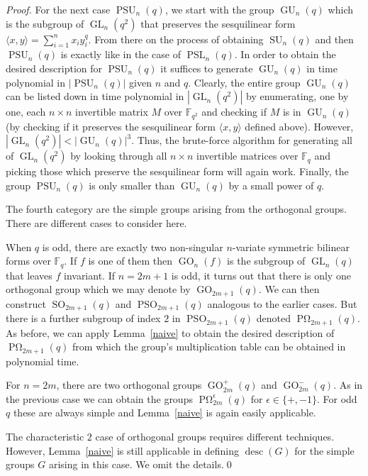 \documentclass{elsarticle}
\newcommand{\desc}{\mathop{\mathrm{desc}}}
\newcommand{\GL}{\mathop{\mathrm{GL}}\nolimits}
\newcommand{\PSL}{\mathop{\mathrm{PSL}}\nolimits}
\newcommand{\GU}{\mathop{\mathrm{GU}}\nolimits}
\newcommand{\PSU}{\mathop{\mathrm{PSU}}\nolimits}
\newcommand{\SU}{\mathop{\mathrm{SU}}\nolimits}
\newcommand{\POm}{\mathop{\mathrm{P}\Omega}\nolimits}
\newcommand{\GO}{\mathop{\mathrm{GO}}\nolimits}
\newcommand{\SO}{\mathop{\mathrm{SO}}\nolimits}
\newcommand{\PSO}{\mathop{\mathrm{PSO}}\nolimits}
\newcommand{\F}{\mathbb{F}}
\renewcommand{\angle}[1]{\langle#1\rangle} %
\begin{document}
\begin{proof}
  For the next case $\PSU_n(q)$, we start with the group $\GU_n(q)$
  which is the subgroup of $\GL_n(q^2)$ that preserves the
  sesquilinear form $\angle{x,y}=\sum_{i=1}^n x_i y_i^q$. From there
  on the process of obtaining $\SU_n(q)$ and then $\PSU_n(q)$ is
  exactly like in the case of $\PSL_n(q)$. In order to obtain the
  desired description for $\PSU_n(q)$ it suffices to generate
  $\GU_n(q)$ in time polynomial in $|\PSU_n(q)|$ given $n$ and
  $q$. Clearly, the entire group $\GU_n(q)$ can be listed down in time
  polynomial in $|\GL_n(q^2)|$ by enumerating, one by one, each
  $n\times n$ invertible matrix $M$ over $\F_{q^2}$ and checking if
  $M$ is in $\GU_n(q)$ (by checking if it preserves the sesquilinear
  form $\angle{x,y}$ defined above). However,
  $|\GL_n(q^2)| < |\GU_n(q)|^3$. Thus, the brute-force algorithm for
  generating all of $\GL_n(q^2)$ by looking through all $n\times n$
  invertible matrices over $\F_q$ and picking those which preserve the
  sesquilinear form will again work. Finally, the group $\PSU_n(q)$ is
  only smaller than $\GU_n(q)$ by a small power of $q$.

  The fourth category are the simple groups arising from the
  orthogonal groups. There are different cases
  to consider here.

  When $q$ is odd, there are exactly two non-singular $n$-variate
  symmetric bilinear forms over $\F_q$. If $f$ is one of them then
  $\GO_n(f)$ is the subgroup of $\GL_n(q)$ that leaves $f$ invariant.
  If $n=2m+1$ is odd, it turns out that there is only one orthogonal
  group which we may denote by $\GO_{2m+1}(q)$. We can then construct
  $\SO_{2m+1}(q)$ and $\PSO_{2m+1}(q)$ analogous to the earlier cases.
  But there is a further subgroup of index $2$ in $\PSO_{2m+1}(q)$
  denoted $\POm_{2m+1}(q)$. As before, we can apply
  Lemma~\ref{naive} to obtain the desired description of
  $\POm_{2m+1}(q)$ from which the group's multiplication table can
  be obtained in polynomial time.

  For $n=2m$, there are two orthogonal groups $\GO^+_{2m}(q)$ and
  $\GO^-_{2m}(q)$. As in the previous case we can obtain the groups
  $\POm^\epsilon_{2m}(q)$ for $\epsilon\in\{+,-1\}$. For odd $q$
  these are always simple and Lemma~\ref{naive} is again easily
  applicable.

  The characteristic $2$ case of orthogonal groups requires different
  techniques. However, Lemma~\ref{naive} is still applicable in
  defining $\desc(G)$ for the simple groups $G$ arising in this
  case. We omit the details.\qed
\end{proof}
\end{document}
